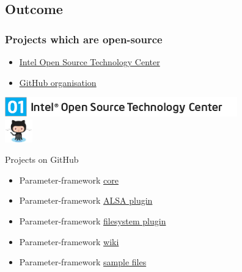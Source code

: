 \subsection{Outcome}
\begin{FrameWithSubSection}
    \frametitle{Projects which are open-source}
    \begin{minipage}{0.6\textwidth}
        \begin{itemize}
            \item \href{https://01.org/}{\color{blue}Intel Open Source Technology Center}
            \item \href{https://github.com/orgs/01org/teams/01-org-parameter-framework-owners}{\color{blue}GitHub organisation}
        \end{itemize}
    \end{minipage}
    \begin{minipage}{0.35\textwidth}
        \flushright
        \includegraphics[width=\textwidth]{./img/01orglogo.png} \\
        \includegraphics[height=1cm]{./img/githubLogo.png}
    \end{minipage}
    \begin{block}{Projects on GitHub}
        \begin{itemize}
            \item Parameter-framework \href{https://github.com/01org/parameter-framework}{\color{blue}core}
            \item Parameter-framework \href{https://github.com/01org/parameter-framework-plugins-alsa}{\color{blue}ALSA plugin}
            \item Parameter-framework \href{https://github.com/01org/parameter-framework-plugins-filesystem}{\color{blue}filesystem plugin}
            \item Parameter-framework \href{https://github.com/01org/parameter-framework/wiki}{\color{blue}wiki}
            \item Parameter-framework \href{https://github.com/01org/parameter-framework-samples}{\color{blue}sample files}
        \end{itemize}
    \end{block}
\end{FrameWithSubSection}

